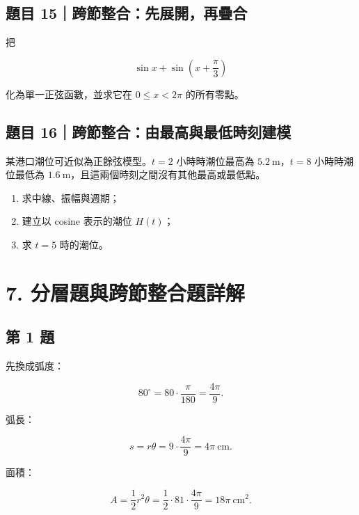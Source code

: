 \documentclass[11pt,a4paper]{article}
\providecommand{\tightlist}{%
  \setlength{\itemsep}{0pt}\setlength{\parskip}{0pt}}
\begin{document}
\subsection{題目 15｜跨節整合：先展開，再疊合}\label{ux984cux76ee-15ux8de8ux7bc0ux6574ux5408ux5148ux5c55ux958bux518dux758aux5408}

把

\[
\sin x+\sin\left(x+\frac\pi3\right)
\]

化為單一正弦函數，並求它在 \(0\le x<2\pi\) 的所有零點。

\subsection{題目 16｜跨節整合：由最高與最低時刻建模}\label{ux984cux76ee-16ux8de8ux7bc0ux6574ux5408ux7531ux6700ux9ad8ux8207ux6700ux4f4eux6642ux523bux5efaux6a21}

某港口潮位可近似為正餘弦模型。\(t=2\) 小時時潮位最高為 \(5.2\ \mathrm m\)，\(t=8\) 小時時潮位最低為 \(1.6\ \mathrm m\)，且這兩個時刻之間沒有其他最高或最低點。

\begin{enumerate}
\def\labelenumi{\arabic{enumi}.}
\tightlist
\item
  求中線、振幅與週期；
\item
  建立以 cosine 表示的潮位 \(H(t)\)；
\item
  求 \(t=5\) 時的潮位。
\end{enumerate}

\clearpage

\section{7. 分層題與跨節整合題詳解}\label{ux5206ux5c64ux984cux8207ux8de8ux7bc0ux6574ux5408ux984cux8a73ux89e3}

\subsection{第 1 題}\label{ux7b2c-1-ux984c}

先換成弧度：

\[
80^\circ=80\cdot\frac\pi{180}=\frac{4\pi}{9}.
\]

弧長：

\[
s=r\theta=9\cdot\frac{4\pi}{9}=\boxed{4\pi\ \mathrm{cm}}.
\]

面積：

\[
A=\frac12r^2\theta
=\frac12\cdot81\cdot\frac{4\pi}{9}
=\boxed{18\pi\ \mathrm{cm^2}}.
\]
\end{document}
